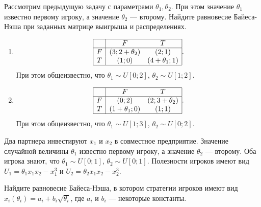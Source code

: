 \begin{problem}
Рассмотрим предыдущую задачу с параметрами $\theta_1,\theta_2$. При этом
значение  $\theta _{1} $  известно первому игроку, а значение  $\theta _{2} $  --- второму. Найдите равновесие Байеса-Нэша при заданных матрице выигрыша и распределениях.

\begin{enumerate}
\item
 $$\begin{array}{|c|cc|}  \hline {} & {F} & {T} \\  \hline {F} & {\left(3;2+\theta _{2} \right)} & {\left(2;1\right)} \\ {T} & {\left(1;0\right)} & {\left(4+\theta _{1} ;1\right)} \\  \hline  \end{array}.$$ При этом общеизвестно, что  $\theta _{1} \sim U\left[0;2\right]$,  $\theta _{2} \sim U\left[1;2\right]$.\\

\item

 $$\begin{array}{|c|cc|}  \hline {} & {F} & {T} \\  \hline {F} & {\left(0;2\right)} & {\left(2;3+\theta _{2} \right)} \\ {T} & {\left(1+\theta _{1} ;0\right)} & {\left(1;1\right)} \\  \hline  \end{array}.$$
 При этом общеизвестно, что  $\theta _{1} \sim U\left[1;3\right]$,  $\theta _{2} \sim U\left[0;2\right].$




\end{enumerate}
\begin{sol}

\end{sol}
\end{problem}



\begin{problem}[Инвестиции.]
Два партнера инвестируют  $x_{1} $  и  $x_{2} $  в совместное предприятие. Значение случайной величины   $\theta _{1} $  известно первому игроку, а значение  $\theta _{2} $  --- второму. Оба игрока знают, что  $\theta _{1} \sim U\left[0;1\right]$,  $\theta _{2} \sim U\left[0;1\right]$.
Полезности игроков имеют вид  $U_{1} =\theta _{1} x_{1} x_{2} -x_{1}^{3} $  и  $U_{2} =\theta _{2} x_{1} x_{2} -x_{2}^{3} $.\par
Найдите равновесие Байеса-Нэша, в котором стратегии игроков имеют вид  $x_{i} \left(\theta _{i} \right)=a_{i} +b_{i} \sqrt{\theta _{i} } $, где  $a_{i} $  и  $b_{i} $  --- некоторые константы. \par




\begin{sol}

\end{sol}
\end{problem}



